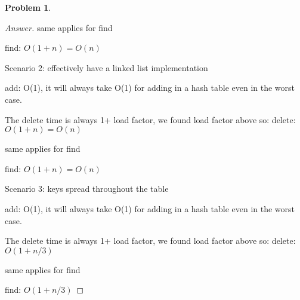 \documentclass[11pt]{article}
\theoremstyle{definition}
\theoremstyle{definition}
\newtheorem{required}{Problem}
\theoremstyle{definition}
\begin{document}
\begin{required}
\begin{enumerate}[label=(\alph*)]
\begin{proof}[Answer]
same applies for find

find: $O(1+n) = O(n)$


Scenario 2: effectively have a linked list implementation

add: O(1), it will always take O(1) for adding in a hash table even in the worst case.

The delete time is always 1+ load factor, we found load factor above so:
delete: $O(1+n) = O(n)$

same applies for find

find: $O(1+n) = O(n)$

Scenario 3: keys spread throughout the table

add: O(1), it will always take O(1) for adding in a hash table even in the worst case.

The delete time is always 1+ load factor, we found load factor above so:
delete: $O(1+n/3)$

same applies for find

find: $O(1+n/3)$
\end{proof}

\end{enumerate}
\end{required}







\end{document}
